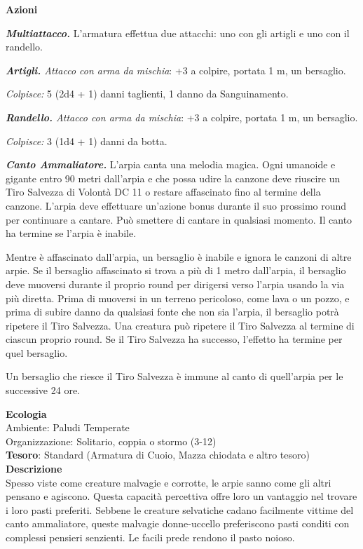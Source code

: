 \begin{multicols}{2}
\textbf{Azioni}

\textit{\textbf{Multiattacco.}} L'armatura effettua due attacchi: uno con gli artigli e uno con il randello.

\textit{\textbf{Artigli.} Attacco con arma da mischia}: +3 a colpire, portata 1 m, un bersaglio.

\textit{Colpisce:} 5 (2d4 + 1) danni taglienti, 1 danno da Sanguinamento.

\textit{\textbf{Randello.} Attacco con arma da mischia}: +3 a colpire, portata 1 m, un bersaglio.

\textit{Colpisce:} 3 (1d4 + 1) danni da botta.

\textit{\textbf{Canto Ammaliatore.}} L'arpia canta una melodia magica. Ogni umanoide e gigante entro 90 metri dall'arpia e che possa udire la canzone deve riuscire un Tiro Salvezza di Volontà DC 11 o restare affascinato fino al termine della canzone. L'arpia deve effettuare un'azione bonus durante il suo prossimo round per continuare a cantare. Può smettere di cantare in qualsiasi momento. Il canto ha termine se l'arpia è inabile.

Mentre è affascinato dall'arpia, un bersaglio è inabile e ignora le canzoni di altre arpie. Se il bersaglio affascinato si trova a più di 1 metro dall'arpia, il bersaglio deve muoversi durante il proprio round per dirigersi verso l'arpia usando la via più diretta. Prima di muoversi in un terreno pericoloso, come lava o un pozzo, e prima di subire danno da qualsiasi fonte che non sia l'arpia, il bersaglio potrà ripetere il Tiro Salvezza. Una creatura può ripetere il Tiro Salvezza al termine di ciascun proprio round. Se il Tiro Salvezza ha successo, l'effetto ha termine per quel bersaglio.

Un bersaglio che riesce il Tiro Salvezza è immune al canto di quell'arpia per le successive 24 ore.

\textbf{Ecologia}\\
Ambiente: Paludi Temperate\\
Organizzazione: Solitario, coppia o stormo (3-12)\\
\textbf{Tesoro}: Standard (Armatura di Cuoio, Mazza chiodata e altro tesoro)\\
\textbf{Descrizione}\\
Spesso viste come creature malvagie e corrotte, le arpie sanno come gli altri pensano e agiscono. Questa capacità percettiva offre loro un vantaggio nel trovare i loro pasti preferiti. Sebbene le creature selvatiche cadano facilmente vittime del canto ammaliatore, queste malvagie donne-uccello preferiscono pasti conditi con complessi pensieri senzienti. Le facili prede rendono il pasto noioso.


\end{multicols}
